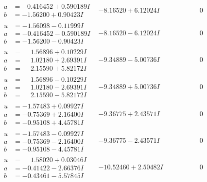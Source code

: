 \documentclass[1p]{elsarticle_modified}
\theoremstyle{definition}
\begin{document}
$$\begin{array}{c|c|c}
\begin{aligned}
a &= -0.416452 + 0.590189 I \\
b &= -1.56200 + 0.90423 I\end{aligned}
 & -8.16520 + 6.12024 I & \phantom{-0.000000 } 0 \\ \hline\begin{aligned}
u &= -1.56098 - 0.11999 I \\
a &= -0.416452 - 0.590189 I \\
b &= -1.56200 - 0.90423 I\end{aligned}
 & -8.16520 - 6.12024 I & \phantom{-0.000000 } 0 \\ \hline\begin{aligned}
u &= \phantom{-}1.56896 + 0.10229 I \\
a &= \phantom{-}1.02180 + 2.69391 I \\
b &= \phantom{-}2.15590 + 5.82172 I\end{aligned}
 & -9.34889 - 5.00736 I & \phantom{-0.000000 } 0 \\ \hline\begin{aligned}
u &= \phantom{-}1.56896 - 0.10229 I \\
a &= \phantom{-}1.02180 - 2.69391 I \\
b &= \phantom{-}2.15590 - 5.82172 I\end{aligned}
 & -9.34889 + 5.00736 I & \phantom{-0.000000 } 0 \\ \hline\begin{aligned}
u &= -1.57483 + 0.09927 I \\
a &= -0.75369 + 2.16400 I \\
b &= -0.95108 + 4.45781 I\end{aligned}
 & -9.36775 + 2.43571 I & \phantom{-0.000000 } 0 \\ \hline\begin{aligned}
u &= -1.57483 - 0.09927 I \\
a &= -0.75369 - 2.16400 I \\
b &= -0.95108 - 4.45781 I\end{aligned}
 & -9.36775 - 2.43571 I & \phantom{-0.000000 } 0 \\ \hline\begin{aligned}
u &= \phantom{-}1.58020 + 0.03046 I \\
a &= -0.41422 - 2.66376 I \\
b &= -0.43461 - 5.57845 I\end{aligned}
 & -10.52460 + 2.50482 I & \phantom{-0.000000 } 0 \\ \hline\begin{aligned}

\end{aligned}
\end{array}$$
\end{document}
